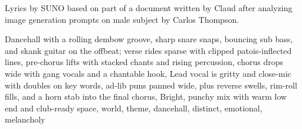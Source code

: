 
\begin{notes}
Lyrics by SUNO based on part of a document written by Claud after analyzing image generation prompts on male subject by Carlos Thompson.
\end{notes}
\begin{style}
Dancehall with a rolling dembow groove, sharp snare snaps, bouncing sub bass, and skank guitar on the offbeat; verse rides sparse with clipped patois-inflected lines, pre-chorus lifts with stacked chants and rising percussion, chorus drops wide with gang vocals and a chantable hook, Lead vocal is gritty and close-mic with doubles on key words, ad-lib puns panned wide, plus reverse swells, rim-roll fills, and a horn stab into the final chorus, Bright, punchy mix with warm low end and club-ready space, world, theme, dancehall, distinct, emotional, melancholy
\end{style}
